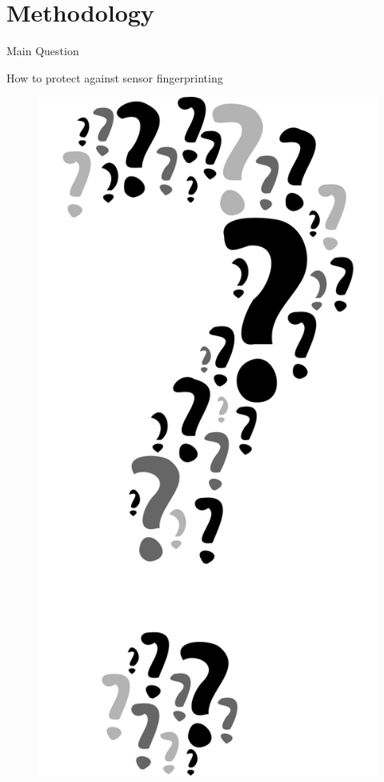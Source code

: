 \documentclass[aspectratio=169]{beamer}
[aspectratio=169] %
\begin{document}
\section{Methodology}

\begin{frame}{Main Question}
  \begin{minipage}{0.65\textwidth} 
    How to protect against sensor fingerprinting
  \end{minipage}
  \hfill
  \begin{minipage}{0.34\textwidth} 
    \begin{figure}
      \centering
      \includegraphics[height=0.5\textheight]{figures/question.png}
    \end{figure}
  \end{minipage}
\end{frame}
\end{document}
